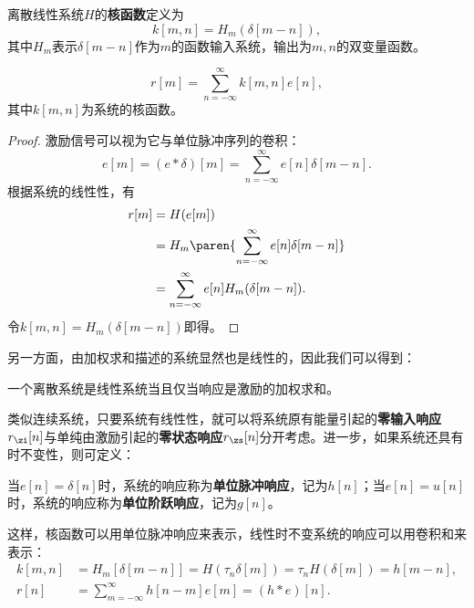 \begin{definition}[离散线性系统的核函数]
    离散线性系统$H$的\textbf{核函数}定义为
    \begin{equation}
        k[m,n]=H_m(\delta[m-n]),
    \end{equation}
    其中$H_m$表示$\delta[m-n]$作为$m$的函数输入系统，输出为$m,n$的双变量函数。
\end{definition}

\begin{theorem}[叠加定理]
    \begin{equation}
        r[m]=\sum_{n=-\infty}^{\infty}k[m,n]e[n],
    \end{equation}
    其中$k[m,n]$为系统的核函数。
\end{theorem}
\begin{proof}
    激励信号可以视为它与单位脉冲序列的卷积：
    \begin{equation}
        e[m]=(e*\delta)[m]=\sum_{n=-\infty}^{\infty}e[n]\delta[m-n].
    \end{equation}
    根据系统的线性性，有
    \begin{align}
        r[m]&=H(e[m]) \nonumber \\
        &=H_m\paren{\sum_{n=-\infty}^{\infty}e[n]\delta[m-n]} \nonumber \\
        &=\sum_{n=-\infty}^{\infty}e[n]H_m(\delta[m-n]).
    \end{align}
    令$k[m,n]=H_m(\delta[m-n])$即得。
\end{proof}

另一方面，由加权求和描述的系统显然也是线性的，因此我们可以得到：
\begin{proposition}[离散线性系统的等价定义]
    一个离散系统是线性系统当且仅当响应是激励的加权求和。
\end{proposition}

类似连续系统，只要系统有线性性，就可以将系统原有能量引起的\textbf{零输入响应}$r_{\zi}[n]$与单纯由激励引起的\textbf{零状态响应}$r_{\zs}[n]$分开考虑。进一步，如果系统还具有时不变性，则可定义：
\begin{definition}[单位脉冲响应与单位阶跃响应]
    当$e[n]=\delta[n]$时，系统的响应称为\textbf{单位脉冲响应}，记为$h[n]$；当$e[n]=u[n]$时，系统的响应称为\textbf{单位阶跃响应}，记为$g[n]$。
\end{definition}

这样，核函数可以用单位脉冲响应来表示，线性时不变系统的响应可以用卷积和来表示：
\begin{align}
    k[m,n]&=H_m[\delta[m-n]]=H(\tau_n \delta[m])=\tau_n H(\delta[m])=h[m-n], \\
    r[n]&=\sum_{m=-\infty}^{\infty}h[n-m]e[m]=(h*e)[n].
\end{align}

